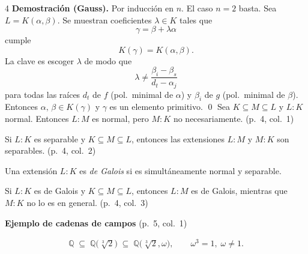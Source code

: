 \documentclass[landscape,a4paper]{article}
\begin{document}
\begin{multicols}{4}
\noindent \textbf{Demostración (Gauss).}  Por inducción en $n$.  El caso $n=2$ basta.  
Sea $L=K(\alpha,\beta)$.  Se muestran coeficientes $\lambda\in K$ tales que
\[
\gamma=\beta+\lambda\alpha
\]
cumple
\[
K(\gamma)=K(\alpha,\beta). \tag*{(p.~3, col.~2)}
\]
La clave es escoger $\lambda$ de modo que
\[
\lambda\neq\frac{\beta_i-\beta_s}{d_t-\alpha_j}
\]
para todas las raíces $d_t$ de $f$ (pol.\ minimal de $\alpha$) y $\beta_i$ de $g$ (pol.\ minimal de $\beta$).  
Entonces $\alpha,\,\beta\in K(\gamma)$ y $\gamma$ es un elemento primitivo. \qed
\noindent Sea $K\subseteq M\subseteq L$ y $L:K$ normal.  Entonces $L:M$ es normal, pero $M:K$ no necesariamente. (p.~4, col.~1)

\noindent Si $L:K$ es separable y $K\subseteq M\subseteq L$, entonces las extensiones $L:M$ y $M:K$ son separables. (p.~4, col.~2)

\begin{tcolorbox}[colback=white,colframe=red!80!black,
                  colbacktitle=red!80!black,coltitle=white,
                  title={Definición: Extensión de Galois (p.~4, col.~3)}]
Una extensión $L:K$ es \emph{de Galois} si es simultáneamente normal y separable.
\end{tcolorbox}

\noindent Si $L:K$ es de Galois y $K\subseteq M\subseteq L$, entonces $L:M$ es de Galois, mientras que $M:K$ no lo es en general. (p.~4, col.~3)

\noindent\textbf{Ejemplo de cadenas de campos} \hfill(p.~5, col.~1)

\begin{align}
\mathbb{Q}\;\subseteq\;\mathbb{Q}\!\bigl(\sqrt[\,3]{2}\bigr)
        \;\subseteq\;\mathbb{Q}\!\bigl(\sqrt[\,3]{2},\omega\bigr),
        \qquad \omega^{3}=1,\;\omega\neq1.
\tag*{(p.~5, col.~1)}
\end{align}


\end{multicols}
\end{document}
